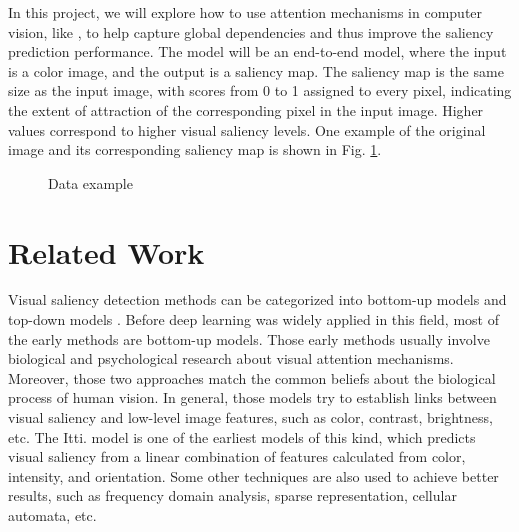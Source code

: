 \documentclass[12pt]{article}
\begin{document}
In this project, we will explore how to use attention mechanisms in computer vision, like \cite{zhangSelfAttentionGenerativeAdversarial2019a},
to help capture global dependencies and thus improve the saliency prediction performance.
The model will be an end-to-end model, where the input is a color image, and the output is a saliency map.
The saliency map is the same size as the input image, with scores from 0 to 1 assigned to every pixel, indicating the extent of attraction of the corresponding pixel in the input image.
Higher values correspond to higher visual saliency levels.
One example of the original image and its corresponding saliency map is shown in Fig. \ref{img:data_example}.
\begin{figure}[h!]
    \centering
    \hspace{5mm}
    \caption{Data example}
    \label{img:data_example}
\end{figure}


\section{Related Work}

Visual saliency detection methods can be categorized into bottom-up models and top-down models \cite{congReviewVisualSaliency2019}.
Before deep learning was widely applied in this field, most of the early methods are bottom-up models.
Those early methods usually involve biological and psychological research about visual attention mechanisms. Moreover, those two approaches match the common beliefs about the biological process of human vision.
In general, those models try to establish links between visual saliency and low-level image features, such as color, contrast, brightness, etc. The Itti. model\cite{ittiModelSaliencybasedVisual1998}
is one of the earliest models of this kind, which predicts visual saliency from a linear combination of features calculated from color, intensity, and orientation.
Some other techniques are also used to achieve better results, such as frequency domain analysis, sparse representation, cellular automata, etc. \cite{congReviewVisualSaliency2019}
\end{document}
